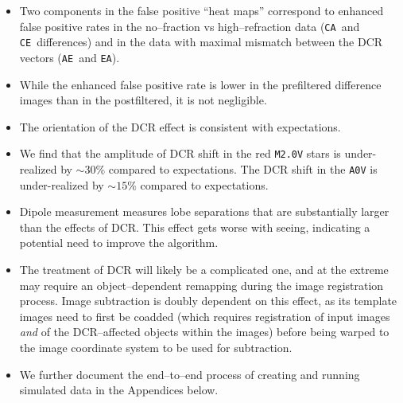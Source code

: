 \documentclass[prd, nofootinbib, floatfix, 11pt, tightenlines, times]{article}
\def\A{{\tt A}}
\def\C{{\tt C}}
\def\E{{\tt E}}
\begin{document}
\begin{itemize}
\item Two components in the false positive ``heat maps'' correspond to
  enhanced false positive rates in the no--fraction vs
  high--refraction data (\C\A\ and \C\E\ differences) and in the data
  with maximal mismatch between the DCR vectors (\A\E\ and \E\A).

\item While the enhanced false positive rate is lower in the
  prefiltered difference images than in the postfiltered, it is not
  negligible.

\item The orientation of the DCR effect is consistent with
  expectations.

\item We find that the amplitude of DCR shift in the red {\tt M2.0V}
  stars is under-realized by $\sim 30\%$ compared to expectations.
  The DCR shift in the {\tt A0V} is under-realized by $\sim 15\%$
  compared to expectations.

\item Dipole measurement measures lobe separations that are
  substantially larger than the effects of DCR.  This effect gets
  worse with seeing, indicating a potential need to improve the
  algorithm.

\item The treatment of DCR will likely be a complicated one, and at
  the extreme may require an object--dependent remapping during the
  image registration process.  Image subtraction is doubly dependent
  on this effect, as its template images need to first be coadded
  (which requires registration of input images {\it and} of the
  DCR--affected objects within the images) before being warped to the
  image coordinate system to be used for subtraction.

\item We further document the end--to--end process of creating and
  running simulated data in the Appendices below.

\end{itemize}

\clearpage


\end{document}
